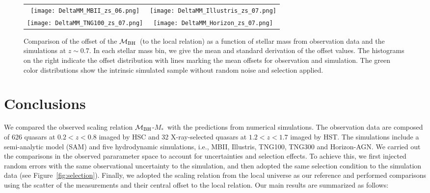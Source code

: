 \documentclass[twocolumn]{aastex631}
\def\smass{{$M_*$}}
\def\mbh{$\mathcal M_{\rm BH}$}
\begin{document}


\begin{figure*}
\centering
\begin{tabular}{c c}
\hspace*{-0.5cm} 
{\texttt{[image: DeltaMM\_MBII\_zs\_06.png]}}&
\hspace*{-0.3cm} 
{\texttt{[image: DeltaMM\_Illustris\_zs\_07.png]}}\\
\hspace*{-0.5cm} 
{\texttt{[image: DeltaMM\_TNG100\_zs\_07.png]}}&
\hspace*{-0.3cm} 
{\texttt{[image: DeltaMM\_Horizon\_zs\_07.png]}}\\
\end{tabular}
\caption{\label{fig:deltaMM} Comparison of the offset of the \mbh\ (to the local relation) as a function of stellar mass from observation data and the simulations at $z\sim0.7$. In each stellar mass bin, we give the mean and standard derivation of the offset values. The histograms on the right indicate the offset distribution with lines marking the mean offsets for observation and simulation. The green color distributions show the intrinsic simulated sample without random noise and selection applied.
}
\end{figure*} 


\section{Conclusions} \label{sec:con}
We compared the observed scaling relation \mbh-\smass\ with the predictions from numerical simulations. The observation data are composed of 626 quasars at $0.2 < z < 0.8$ imaged by HSC and 32 X-ray-selected quasars at $1.2 < z < 1.7$ imaged by HST. The simulations include a semi-analytic model (SAM) and five hydrodynamic simulations, i.e., MBII, Illustris, TNG100, TNG300 and Horizon-AGN. We carried out the comparisons in the observed pararameter space to account for uncertainties and selection effects. To achieve this, we first injected random errors with the same observational uncertainty to the simulation, and then adopted the same selection condition to the simulation data (see Figure~\ref{fig:selection}). Finally, we adopted the scaling relation from the local universe as our reference and performed comparisons using the scatter of the measurements and their central offset to the local relation. Our main results are summarized as follows:
\end{document}
